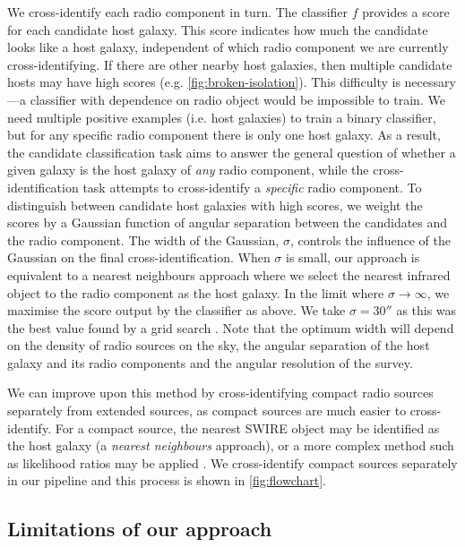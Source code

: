 \documentclass[11pt, a4paper]{book}
\providecommand{\DIFaddtex}[1]{{\protect\color{blue}\uwave{#1}}} %
\providecommand{\DIFaddbegin}{} %
\providecommand{\DIFaddend}{} %
\providecommand{\DIFadd}[1]{\texorpdfstring{\DIFaddtex{#1}}{#1}} %
\newcommand{\DIFaddincludegraphics}[2][]{{\color{blue}\fbox{\DIFOincludegraphics[#1]{#2}}}} %
\DeclareRobustCommand{\DIFaddbegin}{\DIFOaddbegin \let\includegraphics\DIFaddincludegraphics} %
\DeclareRobustCommand{\DIFaddend}{\DIFOaddend \let\includegraphics\DIFOincludegraphics} %
\begin{document}
    {We cross-identify each radio component in turn. The classifier $f$
    provides a score for each candidate host galaxy. This score indicates how
    much the candidate looks like a host galaxy, independent of which radio
    component we are currently cross-identifying. If there are other nearby host
    galaxies, then multiple candidate hosts may have high scores (e.g.
    \autoref{fig:broken-isolation}). This difficulty is necessary---a classifier
    with dependence on radio object would be impossible to train. We
    need multiple positive examples (i.e. host galaxies) to train a binary classifier, but
    for any specific radio component there is only one host galaxy. As a
    result, the candidate classification task aims to answer the general question
    of whether a given galaxy is the host galaxy of \emph{any} radio
    component, while the cross-identification task attempts to cross-identify
    a \emph{specific} radio component. To distinguish between candidate host
    galaxies with high scores, we weight the scores by a Gaussian function of
    angular separation between the candidates and the radio component.} The
    width of the Gaussian, $\sigma$, controls the influence of the Gaussian on
    the final cross-identification. When $\sigma$ is small, our approach is
    equivalent to a nearest neighbours approach where we select the nearest
    infrared object to the radio component as the host galaxy. In the limit
    where $\sigma \to \infty$, we maximise the score output by the
    classifier as above. We take $\sigma = 30''$ as this was the best value
    found by a grid search \DIFaddbegin \DIFadd{maximising cross-identification accuracy}\DIFaddend . {Note that the optimum width will depend on
    the density of radio sources on the sky, the angular separation of the
    host galaxy and its radio components and the angular resolution of the survey.}

    {We can improve upon this method by cross-identifying compact radio sources
    separately from extended sources, as compact sources are much easier to
    cross-identify. For a compact source, the nearest SWIRE object may be
    identified as the host galaxy (a \emph{nearest neighbours} approach), or a
    more complex method such as likelihood ratios may be applied
    \citep[see][]{weston18lrpy}. We cross-identify compact sources separately
    in our pipeline and this process is shown in \autoref{fig:flowchart}.}

  \subsection{Limitations of our approach}
    \label{sec:atlas-xid-limitations}
\end{document}
